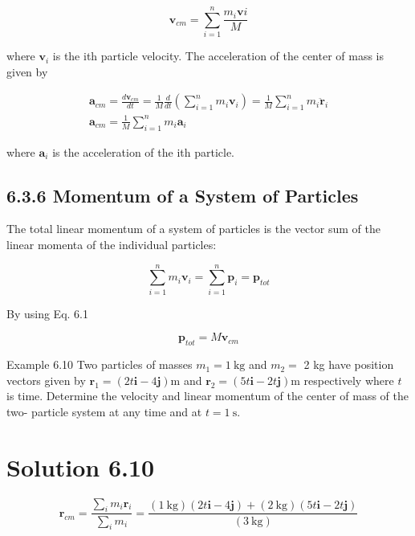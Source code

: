 \documentclass[10pt]{article}
\begin{document}
\begin{equation*}
\mathbf{v}_{c m}=\sum_{i=1}^{n} \frac{m_{i} \mathbf{v} i}{M} \tag{6.1}
\end{equation*}


where $\mathbf{v}_{i}$ is the ith particle velocity. The acceleration of the center of mass is given by


\begin{gather*}
\mathbf{a}_{c m}=\frac{d \mathbf{v}_{c m}}{d t}=\frac{1}{M} \frac{d}{d t}\left(\sum_{i=1}^{n} m_{i} \mathbf{v}_{i}\right)=\frac{1}{M} \sum_{i=1}^{n} m_{i} \ddot{\mathbf{r}}_{i} \\
\mathbf{a}_{c m}=\frac{1}{M} \sum_{i=1}^{n} m_{i} \mathbf{a}_{i} \tag{6.2}
\end{gather*}


where $\mathbf{a}_{i}$ is the acceleration of the ith particle.

\subsection*{6.3.6 Momentum of a System of Particles}
The total linear momentum of a system of particles is the vector sum of the linear momenta of the individual particles:


\begin{equation*}
\sum_{i=1}^{n} m_{i} \mathbf{v}_{i}=\sum_{i=1}^{n} \mathbf{p}_{i}=\mathbf{p}_{t o t} \tag{6.3}
\end{equation*}


By using Eq. 6.1


\begin{equation*}
\mathbf{p}_{t o t}=M \mathbf{v}_{c m} \tag{6.4}
\end{equation*}


Example 6.10 Two particles of masses $m_{1}=1 \mathrm{~kg}$ and $m_{2}=$ 2 kg have position vectors given by $\mathbf{r}_{1}=(2 t \mathbf{i}-4 \mathbf{j}) \mathrm{m}$ and $\mathbf{r}_{2}=(5 t \mathbf{i}-2 t \mathbf{j}) \mathrm{m}$ respectively where $t$ is time. Determine the velocity and linear momentum of the center of mass of the two- particle system at any time and at $t=1 \mathrm{~s}$.

\section*{Solution 6.10}
$$
\mathbf{r}_{c m}=\frac{\sum_{i} m_{i} \mathbf{r}_{i}}{\sum_{i} m_{i}}=\frac{(1 \mathrm{~kg})(2 t \mathbf{i}-4 \mathbf{j})+(2 \mathrm{~kg})(5 t \mathbf{i}-2 t \mathbf{j})}{(3 \mathrm{~kg})}
$$
\end{document}
